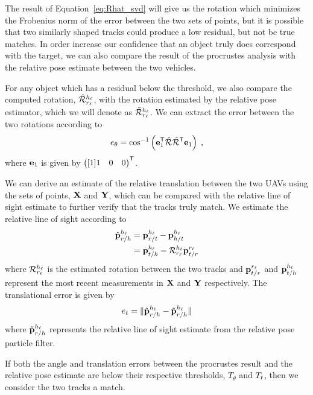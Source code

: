 The result of Equation~\eqref{eq:Rhat_svd} will give us the rotation which minimizes the Frobenius norm of the error between the two sets of points, but it is possible that two similarly shaped tracks could produce a low residual, but not be true matches. In order increase our confidence that an object truly does correspond with the target, we can also compare the result of the procrustes analysis with the relative pose estimate between the two vehicles.

For any object which has a residual below the threshold, we also compare the computed rotation, $\Rothat{\tv}{\hv}$, with the rotation estimated by the relative pose estimator, which we will denote as $\Rot[\tilde]{\tv}{\hv}$. We can extract the error between the two rotations according to
\begin{equation}
    e_\theta = \cos^{-1} \left(\e_1^\transpose\Rothat{}{}\Rot[\tilde]{}{\transpose}\e_1\right)\;,
\end{equation}
where $\e_1$ is given by $\pmat{1 & 0 & 0}^\transpose$.

We can derive an estimate of the relative translation between the two UAVs using the sets of points, $\X$ and $\Y$, which can be compared with the relative line of sight estimate to further verify that the tracks truly match. We estimate the relative line of sight according to
\begin{align}
    \p[\hat]_{\TwrtH}^\hv &= \p_{\TwrtTG}^\hv - \p_{\HwrtTG}^\hv \\
        &= \p_{\TGwrtH}^\hv - \Rot{\tv}{\hv}\p_{\TGwrtT}^\tv
\end{align}
where $\Rot{\tv}{\hv}$ is the estimated rotation between the two tracks and $\p_{\TGwrtT}^\tv$ and $\p_{\TGwrtH}^\hv$ represent the most recent measurements in $\X$ and $\Y$ respectively. The translational error is given by
\begin{equation}
    e_t =  \norm{ \p[\hat]_{\TwrtH}^\hv -  \p[\tilde]_{\TwrtH}^\hv }
\end{equation}
where $\p[\tilde]_{\TwrtH}^\hv$ represents the relative line of sight estimate from the relative pose particle filter.

If both the angle and translation errors between the procrustes result and the relative pose estimate are below their respective thresholds, $T_\theta$ and $T_\t$, then we consider the two tracks a match.

